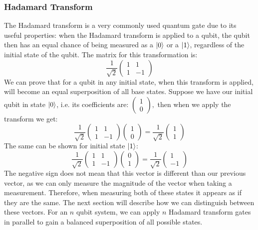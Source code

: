 \subsubsection{Hadamard Transform}
The Hadamard transform is a very commonly used quantum gate due to its useful properties: when the Hadamard transform is applied to a qubit, the qubit then has an equal chance of being measured as a $\ket{0}$ or a $\ket{1}$, regardless of the initial state of the qubit. The matrix for this transformation is: $$\frac{1}{\sqrt{2}}\begin{pmatrix} 1 & 1 \\ 1 & -1 \end{pmatrix}$$ We can prove that for a qubit in any initial state, when this transform is applied, will become an equal superposition of all base states. Suppose we have our initial qubit in state $\ket{0}$, i.e. its coefficients are: $\begin{pmatrix} 1 \\ 0 \end{pmatrix},$ then when we apply the transform we get: $$\frac{1}{\sqrt{2}}\begin{pmatrix} 1 & 1 \\ 1 & -1 \end{pmatrix} \begin{pmatrix} 1 \\ 0 \end{pmatrix} = \frac{1}{\sqrt{2}}\begin{pmatrix} 1 \\ 1 \end{pmatrix}$$ The same can be shown for initial state $\ket{1}$: $$\frac{1}{\sqrt{2}}\begin{pmatrix} 1 & 1 \\ 1 & -1 \end{pmatrix} \begin{pmatrix} 0 \\ 1 \end{pmatrix} = \frac{1}{\sqrt{2}}\begin{pmatrix} 1 \\ -1 \end{pmatrix}$$ The negative sign does not mean that this vector is different than our previous vector, as we can only measure the magnitude of the vector when taking a measurement. Therefore, when measuring both of these states it appears as if they are the same. The next section will describe how we can distinguish between these vectors. For an $n$ qubit system, we can apply $n$ Hadamard transform gates in parallel to gain a balanced superposition of all possible states.

